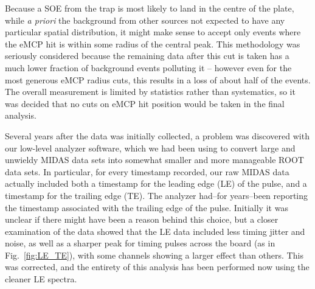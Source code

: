Because a SOE from the trap is most likely to land in the centre of the plate, while \emph{a priori} the background from other sources not expected to have any particular spatial distribution,  it might make sense to accept only events where the eMCP hit is within some radius of the central peak.  This methodology was seriously considered because the remaining data after this cut is taken has a much lower fraction of background events polluting it -- however even for the most generous eMCP radius cuts, this results in a loss of about half of the events.  The overall measurement is limited by statistics rather than systematics, so it was decided that no cuts on eMCP hit position would be taken in the final analysis.


Several years after the data was initially collected, a problem was discovered with our low-level analyzer software, which we had been using to convert large and unwieldy MIDAS data sets into somewhat smaller and more manageable ROOT data sets.  In particular, for every timestamp recorded, our raw MIDAS data actually included both a timestamp for the leading edge (LE) of the pulse, and a timestamp for the trailing edge (TE).  The analyzer had--for years--been reporting the timestamp associated with the trailing edge of the pulse.  Initially it was unclear if there might have been a reason behind this choice, but a closer examination of the data showed that the LE data included less timing jitter and noise, as well as a sharper peak for timing pulses across the board (as in Fig.~\ref{fig:LE_TE}), with some channels showing a larger effect than others.  This was corrected, and the entirety of this analysis has been performed now using the cleaner LE spectra.  

